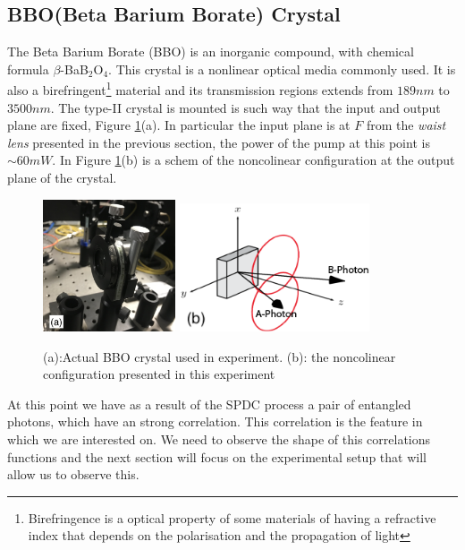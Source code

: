 \subsection{BBO(Beta Barium Borate) Crystal}
The Beta Barium Borate (BBO) is an inorganic compound, with chemical formula $\beta$-BaB$_{2}$O$_4$. This crystal is a
nonlinear optical media commonly used. It is also a birefringent\footnote{Birefringence is a optical property of some materials of 
having a refractive index that depends on the polarisation and the propagation of light\cite{hecht}} material and its transmission regions extends
from $189nm$ to $3500nm$\cite{bbo}.
The type-II crystal is mounted is such way that the input and output plane are fixed, Figure \ref{fig:bbo}(a). In particular the input plane is at $F$ from 
the \textit{waist lens} presented in the previous section, the power of the pump at this point is $\sim 60mW$. In Figure \ref{fig:bbo}(b) is a schem of 
the noncolinear configuration at the output plane of the crystal.

\begin{figure}[h!]
\centering
{\includegraphics[width=0.35\textwidth]{Figures/bbo.jpg}}
{  \includegraphics[width=0.5\textwidth]{Figures/aPhotonBPhoton.png} }
\caption{(a):Actual BBO crystal used in experiment. (b): the noncolinear configuration presented in this experiment}
 \label{fig:bbo}
\end{figure} 

At this point we have as a result of the SPDC process a pair of entangled photons, which have an strong correlation. This correlation is 
the feature in which we are interested on. We need to observe the shape of this correlations functions and the next section will focus 
on the experimental setup that will allow us to observe this.



